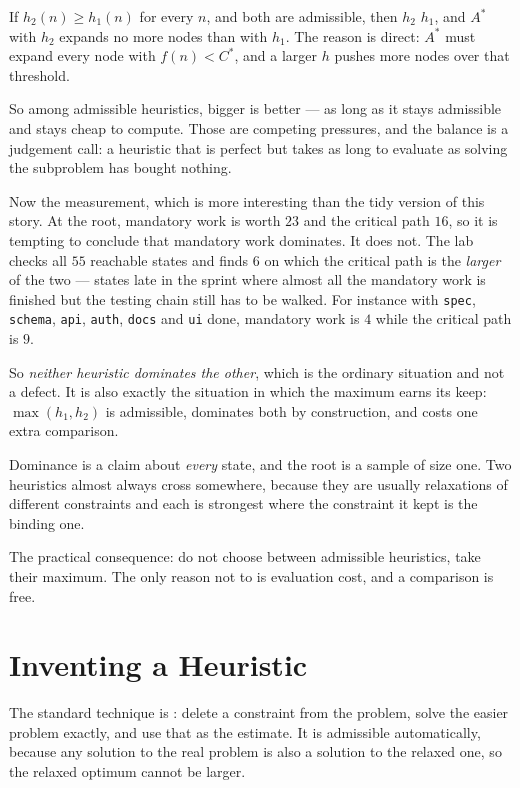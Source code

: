 If $h_{2}(n) \ge h_{1}(n)$ for every $n$, and both are admissible, then $h_{2}$
 $h_{1}$, and $A^{*}$ with $h_{2}$ expands no more nodes than with
$h_{1}$. The reason is direct: $A^{*}$ must expand every node with
$f(n) < C^{*}$, and a larger $h$ pushes more nodes over that threshold.

So among admissible heuristics, bigger is better --- as long as it stays admissible
and stays cheap to compute. Those are competing pressures, and the balance is a
judgement call: a heuristic that is perfect but takes as long to evaluate as solving
the subproblem has bought nothing.

Now the measurement, which is more interesting than the tidy version of this story.
At the root, mandatory work is worth $23$ and the critical path $16$, so it is
tempting to conclude that mandatory work dominates. It does not. The lab checks all
$55$ reachable states and finds $6$ on which the critical path is the \emph{larger}
of the two --- states late in the sprint where almost all the mandatory work is
finished but the testing chain still has to be walked. For instance with
\texttt{spec}, \texttt{schema}, \texttt{api}, \texttt{auth}, \texttt{docs} and
\texttt{ui} done, mandatory work is $4$ while the critical path is $9$.

So \emph{neither heuristic dominates the other}, which is the ordinary situation and
not a defect. It is also exactly the situation in which the maximum earns its keep:
$\max(h_{1},h_{2})$ is admissible, dominates both by construction, and costs one
extra comparison.

\begin{conceptbox}
Dominance is a claim about \emph{every} state, and the root is a sample of size one.
Two heuristics almost always cross somewhere, because they are usually relaxations
of different constraints and each is strongest where the constraint it kept is the
binding one.

The practical consequence: do not choose between admissible heuristics, take their
maximum. The only reason not to is evaluation cost, and a comparison is free.
\end{conceptbox}

\section{Inventing a Heuristic}

The standard technique is : delete a constraint from the problem,
solve the easier problem exactly, and use that as the estimate. It is admissible
automatically, because any solution to the real problem is also a solution to the
relaxed one, so the relaxed optimum cannot be larger.


